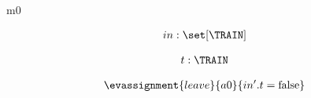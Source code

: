 \documentclass[12pt]{amsart}
\title{}
\author{}
\date{} %
\begin{document}
\maketitle
\tableofcontents


\begin{machine}{m0}


%
	\begin{align*}
\variable{		in : \set[\TRAIN]}
	\end{align*}
%




\begin{align*}
\dummy{	t : \TRAIN}
\end{align*}

%

\begin{align*}
\evassignment{leave}{a0}
{	in'.t = \false	}
\end{align*}

\withsets{\TRAIN}

\end{machine}
\end{document}
